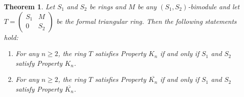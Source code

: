 \documentclass[12pt]{amsart}
\newtheorem{theorem}{Theorem}[section]
\theoremstyle{definition}
\numberwithin{equation}{section}
\begin{document}
\begin{theorem}\label{THM: Property Kn for triangular matrix rings}
    Let $S_1$ and $S_2$ be  rings and $M$ be any $(S_1,S_2)$-bimodule and let $T=\begin{pmatrix}
            S_1&M\\
            0&S_2
        \end{pmatrix}$  be the formal triangular ring. Then the following statements hold:
    \begin{enumerate}
        \item For any $n \geq 2$, the ring $T$ satisfies Property $K_n$ if and only if $S_1$ and $S_2$ satisfy Property $K_n$. 
        \item For any $n \geq 2$, the ring $T$ satisfies Property $\overline{K_n}$ if and only if $S_1$ and $S_2$ satisfy Property $\overline{K_n}$. 
    \end{enumerate}
    \end{theorem}
\end{document}
